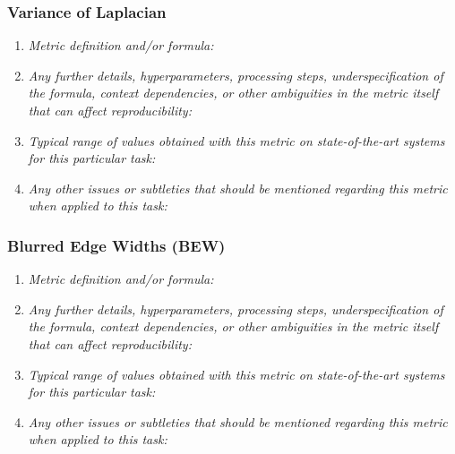 \documentclass[a4paper,11pt]{article}
\begin{document}
        \subsubsection{Variance of Laplacian}
            \begin{enumerate}[label=\alph*.]
                \item \textit{Metric definition and/or formula:}
                \bigskip
                \item \textit{Any further details, hyperparameters, processing steps, underspecification of the formula, context dependencies, or other ambiguities in the metric itself that can affect reproducibility:}
                \bigskip
                \item \textit{Typical range of values obtained with this metric on state-of-the-art systems for this particular task:}
                \bigskip
                \item \textit{Any other issues or subtleties that should be mentioned regarding this metric when applied to this task:}
                \bigskip
            \end{enumerate}
        \subsubsection{Blurred Edge Widths (BEW)}
            \begin{enumerate}[label=\alph*.]
                \item \textit{Metric definition and/or formula:}
                \bigskip
                \item \textit{Any further details, hyperparameters, processing steps, underspecification of the formula, context dependencies, or other ambiguities in the metric itself that can affect reproducibility:}
                \bigskip
                \item \textit{Typical range of values obtained with this metric on state-of-the-art systems for this particular task:}
                \bigskip
                \item \textit{Any other issues or subtleties that should be mentioned regarding this metric when applied to this task:}
                \bigskip
            \end{enumerate}
\end{document}
